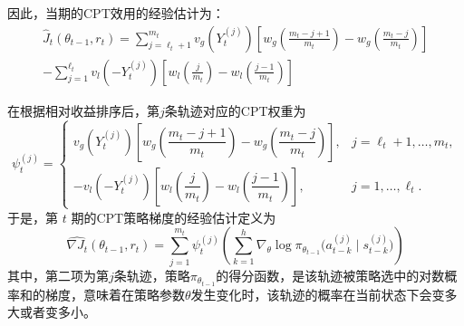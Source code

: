 \documentclass{sufethesismas}
\begin{document}
因此，当期的CPT效用的经验估计为：
\begin{equation}
\begin{aligned}
\widehat{J}_t(\theta_{t-1},r_t)
=
\sum_{j=\ell_t+1}^{m_t}
v_g\!\left(Y_t^{(j)}\right)
\left[
w_g\!\left(\frac{m_t-j+1}{m_t}\right)
-
w_g\!\left(\frac{m_t-j}{m_t}\right)
\right] \\
-
\sum_{j=1}^{\ell_t}
v_l\!\left(-Y_t^{(j)}\right)
\left[
w_l\!\left(\frac{j}{m_t}\right)
-
w_l\!\left(\frac{j-1}{m_t}\right)
\right]
\end{aligned}
\end{equation}


在根据相对收益排序后，第$j$条轨迹对应的CPT权重为
\begin{equation}
\psi_t^{(j)}
=
\begin{cases}
v_g\!\left(Y_t^{(j)}\right)
\left[
w_g\!\left(\dfrac{m_t-j+1}{m_t}\right)
-
w_g\!\left(\dfrac{m_t-j}{m_t}\right)
\right], & j=\ell_t+1,\dots,m_t, \\[1.2ex]
-
v_l\!\left(-Y_t^{(j)}\right)
\left[
w_l\!\left(\dfrac{j}{m_t}\right)
-
w_l\!\left(\dfrac{j-1}{m_t}\right)
\right], & j=1,\dots,\ell_t.
\end{cases}
\end{equation}
于是，第 $t$ 期的CPT策略梯度的经验估计定义为
\begin{equation}
\widehat{\nabla J_t}(\theta_{t-1},r_t)
=
\sum_{j=1}^{m_t}
\psi_t^{(j)}
\left(
\sum_{k=1}^{h}
\nabla_{\theta}
\log \pi_{\theta_{t-1}}
\bigl(
    a_{t-k}^{(j)} \mid s_{t-k}^{(j)}
\bigr)
\right)
\end{equation}
其中，第二项为第$j$条轨迹，策略$\pi_{\theta_{t-1}}$的得分函数，是该轨迹被策略选中的对数概率和的梯度，意味着在策略参数$\theta$发生变化时，该轨迹的概率在当前状态下会变多大或者变多小。
\end{document}
